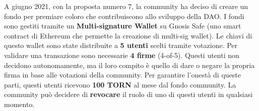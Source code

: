A giugno 2021, con la proposta numero 7, la community ha deciso di creare un fondo per premiare coloro che contribuiscono allo sviluppo della DAO.
I fondi sono gestiti tramite un \textbf{Multi-signature Wallet} su Gnosis Safe (uno smart contract di Ethereum che permette la creazione di multi-sig wallet).
Le chiavi di questo wallet sono state distribuite a \textbf{5 utenti} scelti tramite votazione.  
Per validare una transazione sono necessarie \textbf{4 firme} (4-of-5).
Questi utenti non decidono autonomamente, ma il loro compito è quello di dare o negare la propria firma in base alle votazioni della community.
Per garantire l'onestà di queste parti, questi utenti ricevono \textbf{100 TORN} al mese dal fondo community.
La community può decidere di \textbf{revocare} il ruolo di uno di questi utenti in qualsiasi momento.
